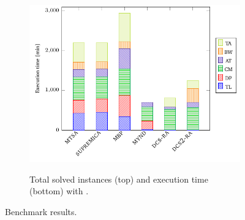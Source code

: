 \begin{figure}[th]
\begin{subfigure}{0.5\textwidth}
        \includegraphics[width=\linewidth]{figures/benchmark/tools_time.pdf}\label{fig:tools:results:time}
        \caption{Total solved instances (top) and execution time (bottom) with \DCS.}
    \end{subfigure}
\caption{Benchmark results.}
\label{fig:tools:results}
\end{figure}
